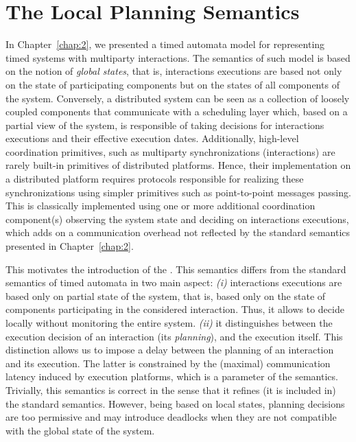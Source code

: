 \chapter{The Local Planning Semantics}\label{chap:5}
\minitoc
\label{sec3}

In Chapter~\ref{chap:2}, we presented a timed automata model for representing timed systems
with multiparty interactions. The semantics of such model is based on the notion of \emph{global
states}, that is, interactions executions are based not only on the state of participating
components but on the states of all components of the system.
Conversely, a distributed system can be seen as a collection of loosely coupled
components that communicate with a scheduling layer which, based on
a partial view of the system, is responsible of taking decisions for interactions executions
and their effective execution dates. 
Additionally, high-level coordination primitives, such as multiparty synchronizations 
(interactions) are rarely built-in primitives of distributed platforms. 
Hence, their implementation on a distributed platform requires 
protocols responsible for realizing these synchronizations using simpler primitives such as 
point-to-point messages passing.
This is classically implemented using one or more additional 
coordination component(s) observing the system state and deciding on interactions executions,
which adds on a communication overhead not reflected by the standard semantics presented in
Chapter~\ref{chap:2}.

This motivates the introduction of the \emph{\lpsb}. This semantics differs from
the standard semantics of timed automata in two main aspect: \emph{(i)} interactions executions
are based only on partial state of the system, that is, based only on the state of components
participating in the considered interaction. Thus, it allows to decide locally without 
monitoring the entire system. \emph{(ii)} it distinguishes between the 
execution decision of an interaction (its \emph{planning}), and the execution itself.
This distinction allows us to impose a delay between the planning of an interaction and 
its execution. The latter is constrained by the (maximal) communication latency induced 
by execution platforms, which is a parameter of the semantics.
Trivially, this semantics is correct in the sense that it refines (it is included in) the standard semantics.
However, being based on local states, planning decisions are too permissive and may 
introduce deadlocks when they are not compatible with the global state of the system.

